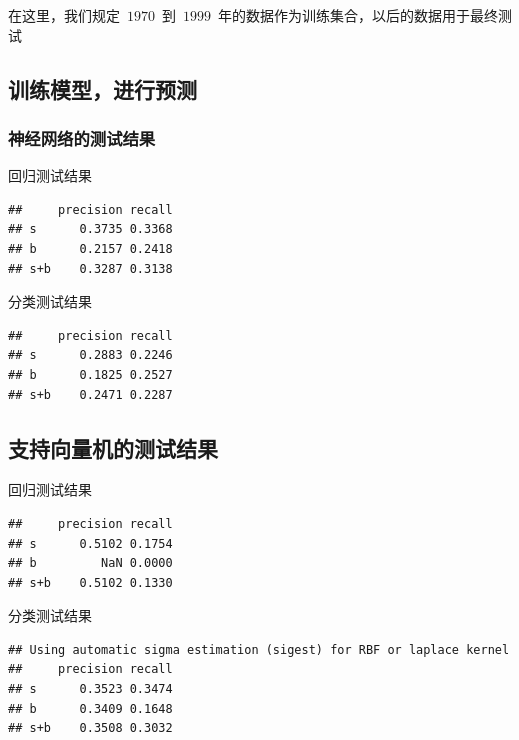 \documentclass{article}\usepackage[]{graphicx}\usepackage[]{color}
\makeatletter
\newenvironment{kframe}{%
 \def\at@end@of@kframe{}%
 \ifinner\ifhmode%
  \def\at@end@of@kframe{\end{minipage}}%
  \begin{minipage}{\columnwidth}%
 \fi\fi%
 \def\FrameCommand##1{\hskip\@totalleftmargin \hskip-\fboxsep
 \colorbox{shadecolor}{##1}\hskip-\fboxsep
     \hskip-\linewidth \hskip-\@totalleftmargin \hskip\columnwidth}%
 \MakeFramed {\advance\hsize-\width
   \@totalleftmargin\z@ \linewidth\hsize
   \@setminipage}}%
 {\par\unskip\endMakeFramed%
 \at@end@of@kframe}
\newenvironment{knitrout}{}{} %
\makeatother
\begin{document}
\begin{CJK*}{UTF8}{gkai}
在这里，我们规定~$1970$~到~$1999$~年的数据作为训练集合，以后的数据用于最终测试

\subsection{训练模型，进行预测}
\subsubsection{神经网络的测试结果}
回归测试结果
\begin{knitrout}
\color{fgcolor}\begin{kframe}
\begin{verbatim}
##     precision recall
## s      0.3735 0.3368
## b      0.2157 0.2418
## s+b    0.3287 0.3138
\end{verbatim}
\end{kframe}
\end{knitrout}

分类测试结果
\begin{knitrout}
\color{fgcolor}\begin{kframe}
\begin{verbatim}
##     precision recall
## s      0.2883 0.2246
## b      0.1825 0.2527
## s+b    0.2471 0.2287
\end{verbatim}
\end{kframe}
\end{knitrout}
\subsection{支持向量机的测试结果}
回归测试结果
\begin{knitrout}
\color{fgcolor}\begin{kframe}
\begin{verbatim}
##     precision recall
## s      0.5102 0.1754
## b         NaN 0.0000
## s+b    0.5102 0.1330
\end{verbatim}
\end{kframe}
\end{knitrout}

分类测试结果
\begin{knitrout}
\color{fgcolor}\begin{kframe}
\begin{verbatim}
## Using automatic sigma estimation (sigest) for RBF or laplace kernel
##     precision recall
## s      0.3523 0.3474
## b      0.3409 0.1648
## s+b    0.3508 0.3032
\end{verbatim}
\end{kframe}
\end{knitrout}

\end{CJK*}
\end{document}
